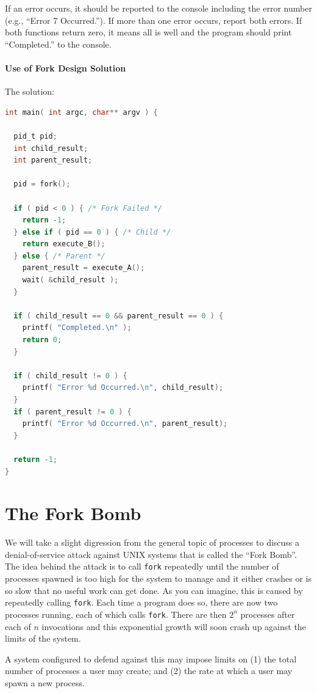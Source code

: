 If an error occurs, it should be reported to the console including the error number (e.g., ``Error 7 Occurred.''). If more than one error occurs, report both errors. If both functions return zero, it means all is well and the program should print ``Completed.'' to the console.

\paragraph{Use of Fork Design Solution} The solution:

\begin{lstlisting}[language=C]
int main( int argc, char** argv ) {

  pid_t pid;
  int child_result;
  int parent_result;

  pid = fork();
  
  if ( pid < 0 ) { /* Fork Failed */
    return -1;
  } else if ( pid == 0 ) { /* Child */
    return execute_B();
  } else { /* Parent */ 
    parent_result = execute_A();
    wait( &child_result );
  }
  
  if ( child_result == 0 && parent_result == 0 ) {
    printf( "Completed.\n" );
    return 0;
  }
  
  if ( child_result != 0 ) {
    printf( "Error %d Occurred.\n", child_result);
  }
  if ( parent_result != 0 ) {
    printf( "Error %d Occurred.\n", parent_result);
  }
  
  return -1;
}
\end{lstlisting}


\section*{The Fork Bomb}

We will take a slight digression from the general topic of processes to discuss a denial-of-service attack against UNIX systems that is called the ``Fork Bomb''. The idea behind the attack is to call \texttt{fork} repeatedly until the number of processes spawned is too high for the system to manage and it either crashes or is so slow that no useful work can get done. As you can imagine, this is caused by repeatedly calling \texttt{fork}. Each time a program does so, there are now two processes running, each of which calls \texttt{fork}. There are then $2^{n}$ processes after each of $n$ invocations and this exponential growth will soon crash up against the limits of the system.

A system configured to defend against this may impose limits on (1) the total number of processes a user may create; and (2) the rate at which a user may spawn a new process.

